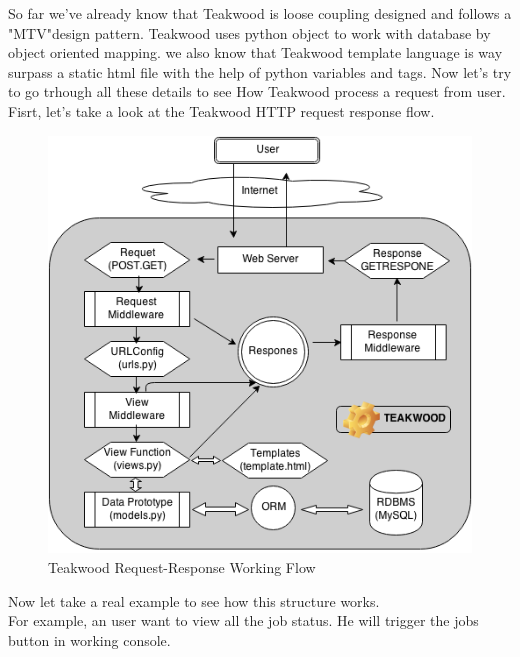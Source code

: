 So far we've already know that Teakwood is loose coupling designed and follows a "MTV"design pattern. Teakwood uses python object to work with database by object oriented mapping. we also know that Teakwood template language is way surpass a static html file with the help of python variables and tags. Now let's try to go trhough all these details to see How Teakwood process a request from user. Fisrt, let's take a look at the Teakwood HTTP request response flow.\\
\begin{figure}[h]
\centering
\includegraphics[scale=0.5]{./http_request_response}
\caption{Teakwood Request-Response Working Flow}
\label{fig:label} %
\end{figure}
Now let take a real example to see how this structure works. \\For example, an user want to view all the job status. He will trigger the jobs button in working console. \\



